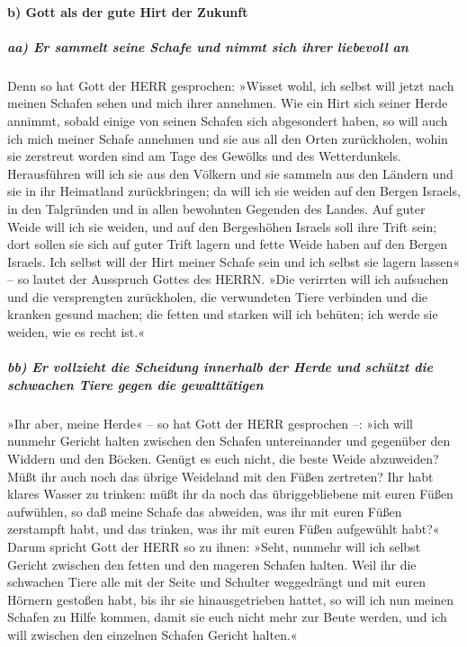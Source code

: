 \hypertarget{b-gott-als-der-gute-hirt-der-zukunft}{%
\paragraph{b) Gott als der gute Hirt der
Zukunft}\label{b-gott-als-der-gute-hirt-der-zukunft}}

\hypertarget{aa-er-sammelt-seine-schafe-und-nimmt-sich-ihrer-liebevoll-an}{%
\subparagraph{aa) Er sammelt seine Schafe und nimmt sich ihrer liebevoll
an}\label{aa-er-sammelt-seine-schafe-und-nimmt-sich-ihrer-liebevoll-an}}

Denn so hat Gott der HERR gesprochen: »Wisset wohl, ich
selbst will jetzt nach meinen Schafen sehen und mich ihrer annehmen.
Wie ein Hirt sich seiner Herde annimmt, sobald einige von
seinen Schafen sich abgesondert haben, so will auch ich mich meiner
Schafe annehmen und sie aus all den Orten zurückholen, wohin sie
zerstreut worden sind am Tage des Gewölks und des Wetterdunkels.
Herausführen will ich sie aus den Völkern und sie sammeln
aus den Ländern und sie in ihr Heimatland zurückbringen; da will ich sie
weiden auf den Bergen Israels, in den Talgründen und in allen bewohnten
Gegenden des Landes. Auf guter Weide will ich sie weiden,
und auf den Bergeshöhen Israels soll ihre Trift sein; dort sollen sie
sich auf guter Trift lagern und fette Weide haben auf den Bergen
Israels. Ich selbst will der Hirt meiner Schafe sein und
ich selbst sie lagern lassen« -- so lautet der Ausspruch Gottes des
HERRN. »Die verirrten will ich aufsuchen und die
versprengten zurückholen, die verwundeten Tiere verbinden und die
kranken gesund machen; die fetten und starken will ich behüten; ich
werde sie weiden, wie es recht ist.«

\hypertarget{bb-er-vollzieht-die-scheidung-innerhalb-der-herde-und-schuxfctzt-die-schwachen-tiere-gegen-die-gewalttuxe4tigen}{%
\subparagraph{bb) Er vollzieht die Scheidung innerhalb der Herde und
schützt die schwachen Tiere gegen die
gewalttätigen}\label{bb-er-vollzieht-die-scheidung-innerhalb-der-herde-und-schuxfctzt-die-schwachen-tiere-gegen-die-gewalttuxe4tigen}}

»Ihr aber, meine Herde« -- so hat Gott der HERR
gesprochen --: »ich will nunmehr Gericht halten zwischen den Schafen
untereinander und gegenüber den Widdern und den Böcken.
Genügt es euch nicht, die beste Weide abzuweiden? Müßt
ihr auch noch das übrige Weideland mit den Füßen zertreten? Ihr habt
klares Wasser zu trinken: müßt ihr da noch das übriggebliebene mit euren
Füßen aufwühlen, so daß meine Schafe das abweiden, was
ihr mit euren Füßen zerstampft habt, und das trinken, was ihr mit euren
Füßen aufgewühlt habt?« Darum spricht Gott der HERR so zu
ihnen: »Seht, nunmehr will ich selbst Gericht zwischen den fetten und
den mageren Schafen halten. Weil ihr die schwachen Tiere
alle mit der Seite und Schulter weggedrängt und mit euren Hörnern
gestoßen habt, bis ihr sie hinausgetrieben hattet, so
will ich nun meinen Schafen zu Hilfe kommen, damit sie euch nicht mehr
zur Beute werden, und ich will zwischen den einzelnen Schafen Gericht
halten.«

